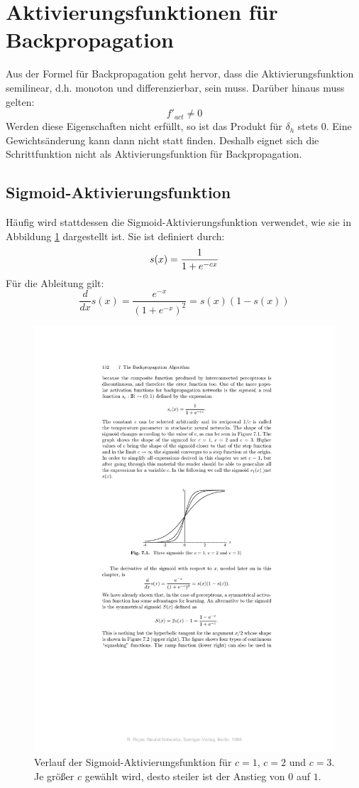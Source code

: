 \section*{Aktivierungsfunktionen für Backpropagation}
Aus der Formel für Backpropagation geht hervor, dass die Aktivierungsfunktion semilinear, d.h. monoton und differenzierbar, sein muss. Darüber hinaus muss gelten:
\[
	f'_{act} \ne 0
\]
Werden diese Eigenschaften nicht erfüllt, so ist das Produkt für $\delta_h$ stets $0$. Eine Gewichtsänderung kann dann nicht statt finden. Deshalb eignet sich die Schrittfunktion nicht als Aktivierungsfunktion für Backpropagation.

\subsection*{Sigmoid-Aktivierungsfunktion}
Häufig wird stattdessen die Sigmoid-Aktivierungsfunktion verwendet, wie sie in Abbildung \ref{fig:ch03_sigmoid} dargestellt ist. Sie ist definiert durch:
\[
	s(x) = \frac{1}{1 + e^{-cx}} \\
\]
Für die Ableitung gilt:
\[
	\frac{d}{dx} s(x) = \frac{e^{-x}}{(1 + e^{-x})^2} = s(x)(1-s(x))
\]

\begin{figure}[ht!] \centering 
	\includegraphics[width=0.7\linewidth]{figures/ch03_sigmoid.pdf}
	\caption{Verlauf der Sigmoid-Aktivierungsfunktion für $c=1$, $c=2$ und $c=3$. Je größer $c$ gewählt wird, desto steiler ist der Anstieg von $0$ auf $1$.}
	\label{fig:ch03_sigmoid}
\end{figure}



